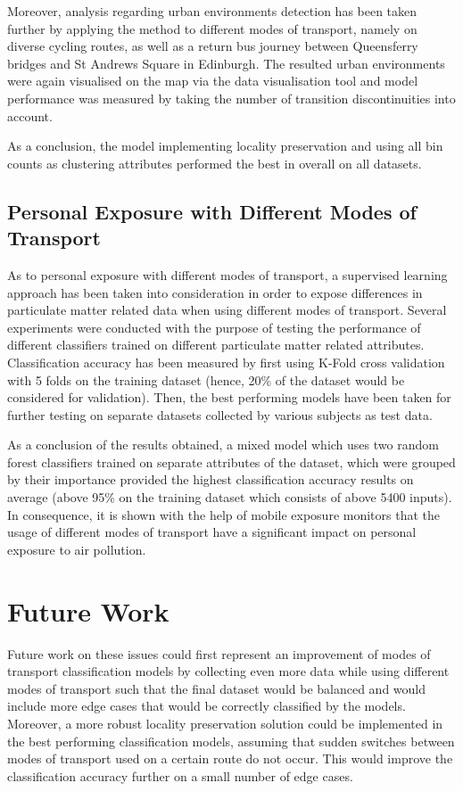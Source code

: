 \documentclass[bsc,frontabs,twoside,singlespacing, parskip,deptreport]{infthesis}     %
\begin{document}
Moreover, analysis regarding urban environments detection has been taken further by applying the method to different modes of transport, namely on diverse cycling routes, as well as a return bus journey between Queensferry bridges and St Andrews Square in Edinburgh. The resulted urban environments were again visualised on the map via the data visualisation tool and model performance was measured by taking the number of transition discontinuities into account.

As a conclusion, the model implementing locality preservation and using all bin counts as clustering attributes performed the best in overall on all datasets.

\subsection{Personal Exposure with Different Modes of Transport}

As to personal exposure with different modes of transport, a supervised learning approach has been taken into consideration in order to expose differences in particulate matter related data when using different modes of transport. Several experiments were conducted with the purpose of testing the performance of different classifiers trained on different particulate matter related attributes. Classification accuracy has been measured by first using K-Fold cross validation with 5 folds on the training dataset (hence, 20\% of the dataset would be considered for validation). Then, the best performing models have been taken for further testing on separate datasets collected by various subjects as test data. 

As a conclusion of the results obtained, a mixed model which uses two random forest classifiers trained on separate attributes of the dataset, which were grouped by their importance provided the highest classification accuracy results on average (above 95\% on the training dataset which consists of above 5400 inputs). In consequence, it is shown with the help of mobile exposure monitors that the usage of different modes of transport have a significant impact on personal exposure to air pollution.


\section{Future Work}

Future work on these issues could first represent an improvement of modes of transport classification models by collecting even more data while using different modes of transport such that the final dataset would be balanced and would include more edge cases that would be correctly classified by the models. Moreover, a more robust locality preservation solution could be implemented in the best performing classification models, assuming that sudden switches between modes of transport used on a certain route do not occur. This would improve the classification accuracy further on a small number of edge cases.
\end{document}
